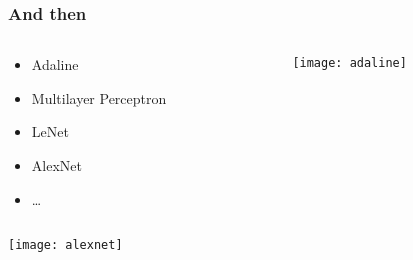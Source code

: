 \documentclass[11pt]{beamer}
\begin{document}
\begin{frame}
  \frametitle{And then}
  \begin{columns}
    \begin{column}{.4\textwidth}
        \begin{itemize}
  \item Adaline 
  \item Multilayer Perceptron
  \item LeNet
  \item AlexNet
  \item \dots
  \end{itemize}
    \end{column}
    \begin{column}{.6\textwidth}
        \texttt{[image: adaline]}
    \end{column}
  \end{columns}
  \texttt{[image: alexnet]}
\end{frame}
\end{document}
